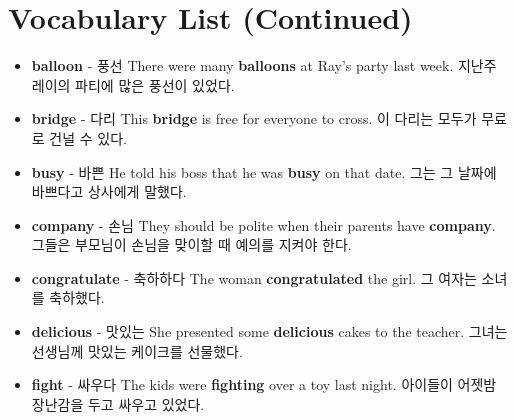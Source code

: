 \documentclass{article}
\begin{document}
\section*{Vocabulary List (Continued)}
\begin{addmargin}[1em]{1em}
    \begin{itemize}
        \item \fontsize{12pt}{14pt}\selectfont \textbf{balloon} - 풍선 \newline
        There were many \textbf{balloons} at Ray's party last week. \newline
        지난주 레이의 파티에 많은 풍선이 있었다.

        \item \fontsize{12pt}{14pt}\selectfont \textbf{bridge} - 다리 \newline
        This \textbf{bridge} is free for everyone to cross. \newline
        이 다리는 모두가 무료로 건널 수 있다.

        \item \fontsize{12pt}{14pt}\selectfont \textbf{busy} - 바쁜 \newline
        He told his boss that he was \textbf{busy} on that date. \newline
        그는 그 날짜에 바쁘다고 상사에게 말했다.

        \item \fontsize{12pt}{14pt}\selectfont \textbf{company} - 손님 \newline
        They should be polite when their parents have \textbf{company}. \newline
        그들은 부모님이 손님을 맞이할 때 예의를 지켜야 한다.

        \item \fontsize{12pt}{14pt}\selectfont \textbf{congratulate} - 축하하다 \newline
        The woman \textbf{congratulated} the girl. \newline
        그 여자는 소녀를 축하했다.

        \item \fontsize{12pt}{14pt}\selectfont \textbf{delicious} - 맛있는 \newline
        She presented some \textbf{delicious} cakes to the teacher. \newline
        그녀는 선생님께 맛있는 케이크를 선물했다.

        \item \fontsize{12pt}{14pt}\selectfont \textbf{fight} - 싸우다 \newline
        The kids were \textbf{fighting} over a toy last night. \newline
        아이들이 어젯밤 장난감을 두고 싸우고 있었다.


\end{itemize}
\end{addmargin}
\end{document}
